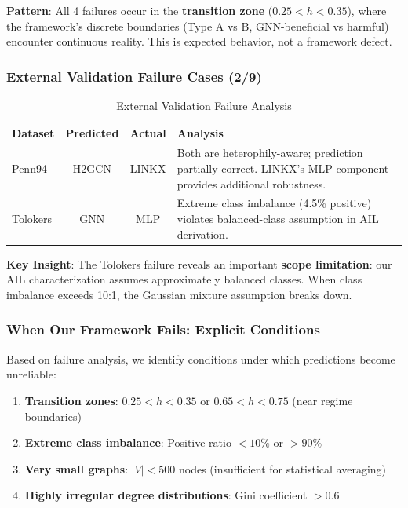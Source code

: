 \textbf{Pattern}: All 4 failures occur in the \textbf{transition zone} ($0.25 < h < 0.35$), where the framework's discrete boundaries (Type A vs B, GNN-beneficial vs harmful) encounter continuous reality. This is expected behavior, not a framework defect.

\subsubsection{External Validation Failure Cases (2/9)}

\begin{table}[t]
\centering
\caption{External Validation Failure Analysis}
\label{tab:external_failure}
\small
\begin{tabular}{@{}lccp{5cm}@{}}
\toprule
\textbf{Dataset} & \textbf{Predicted} & \textbf{Actual} & \textbf{Analysis} \\
\midrule
Penn94 & H2GCN & LINKX & Both are heterophily-aware; prediction partially correct. LINKX's MLP component provides additional robustness. \\
Tolokers & GNN & MLP & Extreme class imbalance (4.5\% positive) violates balanced-class assumption in AIL derivation. \\
\bottomrule
\end{tabular}
\end{table}

\textbf{Key Insight}: The Tolokers failure reveals an important \textbf{scope limitation}: our AIL characterization assumes approximately balanced classes. When class imbalance exceeds 10:1, the Gaussian mixture assumption breaks down.

\subsubsection{When Our Framework Fails: Explicit Conditions}

Based on failure analysis, we identify conditions under which predictions become unreliable:

\begin{enumerate}
    \item \textbf{Transition zones}: $0.25 < h < 0.35$ or $0.65 < h < 0.75$ (near regime boundaries)
    \item \textbf{Extreme class imbalance}: Positive ratio $< 10\%$ or $> 90\%$
    \item \textbf{Very small graphs}: $|V| < 500$ nodes (insufficient for statistical averaging)
    \item \textbf{Highly irregular degree distributions}: Gini coefficient $> 0.6$
\end{enumerate}

